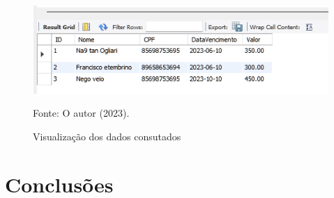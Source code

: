 \begin{figure}[h!]
\caption{Visualização dos dados consutados}
\begin{center}
   \includegraphics[scale=1]{figure/view.png}
\end{center}
\label{fig:view}
{\fontsize{10pt}{\baselineskip}\selectfont
Fonte: O autor (2023).}
\end{figure}



\section{Conclusões}


